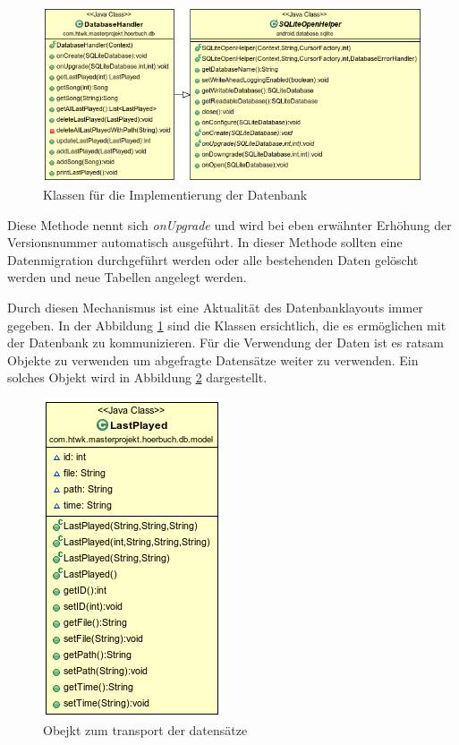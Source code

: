 \begin{figure}
\begin{center}
\includegraphics[scale=0.7]{images/database}
\caption{Klassen für die Implementierung der Datenbank}
\label{database}
\end{center}
\end{figure}


Diese Methode nennt sich \textit{onUpgrade} und wird bei eben erwähnter Erhöhung der Versionsnummer automatisch ausgeführt. In dieser Methode sollten eine Datenmigration durchgeführt werden oder alle bestehenden Daten gelöscht werden und neue Tabellen angelegt werden.

Durch diesen Mechanismus ist eine Aktualität des Datenbanklayouts immer gegeben. In der Abbildung \ref{database} sind die Klassen ersichtlich, die es ermöglichen mit der Datenbank zu kommunizieren. Für die Verwendung der Daten ist es ratsam Objekte zu verwenden um abgefragte Datensätze weiter zu verwenden. Ein solches Objekt wird in Abbildung \ref{dbmodel} dargestellt.

\begin{figure}
\begin{center}
\includegraphics[scale=0.7]{images/dbmodel}
\caption{Obejkt zum transport der datensätze}
\label{dbmodel}
\end{center}
\end{figure}

